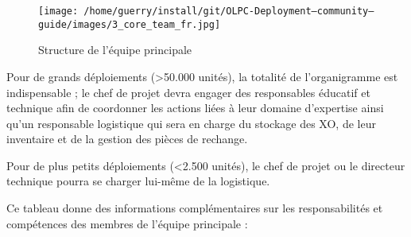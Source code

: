 \documentclass[12pt]{article}
\begin{document}
\begin{figure}[htb]
\centering
\texttt{[image: /home/guerry/install/git/OLPC-Deployment--community--guide/images/3\_core\_team\_fr.jpg]}
\caption{Structure de l'équipe principale}
\end{figure}

Pour de grands déploiements (>50.000 unités), la totalité de l'organigramme
est indispensable ; le chef de projet devra engager des responsables
éducatif et technique afin de coordonner les actions liées à leur domaine
d'expertise ainsi qu'un responsable logistique qui sera en charge du
stockage des XO, de leur inventaire et de la gestion des pièces de
rechange.

Pour de plus petits déploiements (<2.500 unités), le chef de projet ou le
directeur technique pourra se charger lui-même de la logistique.

Ce tableau donne des informations complémentaires sur les responsabilités
et compétences des membres de l'équipe principale :

\end{document}
